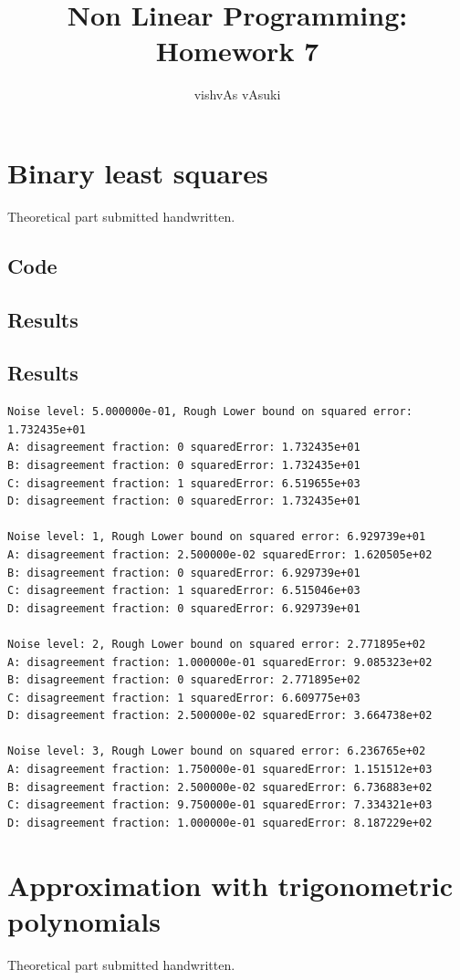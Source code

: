 \documentclass{article}
\title{Non Linear Programming: Homework 7}
\author{vishvAs vAsuki}
\begin{document}
\maketitle
\section{Binary least squares}
Theoretical part submitted handwritten.

\subsection{Code}


\subsection{Results}
\subsection{Results}
\begin{verbatim}
Noise level: 5.000000e-01, Rough Lower bound on squared error: 1.732435e+01
A: disagreement fraction: 0 squaredError: 1.732435e+01
B: disagreement fraction: 0 squaredError: 1.732435e+01
C: disagreement fraction: 1 squaredError: 6.519655e+03
D: disagreement fraction: 0 squaredError: 1.732435e+01

Noise level: 1, Rough Lower bound on squared error: 6.929739e+01
A: disagreement fraction: 2.500000e-02 squaredError: 1.620505e+02
B: disagreement fraction: 0 squaredError: 6.929739e+01
C: disagreement fraction: 1 squaredError: 6.515046e+03
D: disagreement fraction: 0 squaredError: 6.929739e+01

Noise level: 2, Rough Lower bound on squared error: 2.771895e+02
A: disagreement fraction: 1.000000e-01 squaredError: 9.085323e+02
B: disagreement fraction: 0 squaredError: 2.771895e+02
C: disagreement fraction: 1 squaredError: 6.609775e+03
D: disagreement fraction: 2.500000e-02 squaredError: 3.664738e+02

Noise level: 3, Rough Lower bound on squared error: 6.236765e+02
A: disagreement fraction: 1.750000e-01 squaredError: 1.151512e+03
B: disagreement fraction: 2.500000e-02 squaredError: 6.736883e+02
C: disagreement fraction: 9.750000e-01 squaredError: 7.334321e+03
D: disagreement fraction: 1.000000e-01 squaredError: 8.187229e+02
\end{verbatim}

\section{Approximation with trigonometric polynomials}
Theoretical part submitted handwritten.
\end{document}
